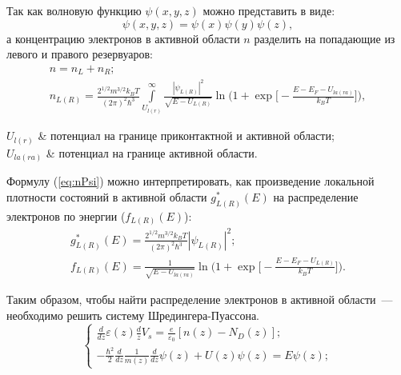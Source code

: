 Так как волновую функцию $\psi(x, y,z )$ можно представить в виде:
\begin{equation}
	\psi(x, y, z) = \psi(x)\psi(y)\psi(z),
\end{equation}
а концентрацию электронов в активной области $n$ разделить на попадающие из левого и правого резервуаров:
\begin{gather}
	n = n_{L} + n_{R};\\
	\label{eq:nPsi}
	n_{L(R)} = \frac{2^{1/2}m^{3/2}k_{B}T}{(2\pi)^{2}\hbar^{3}}\int\limits_{U_{l(r)}}^{\infty} \frac{|\psi_{L(R)}|^{2}}{\sqrt{E - U_{L(R)}}} \ln \bigg( 1 + \exp\bigg[ -\frac{E - E_{F} - U_{la(ra)}}{k_{B}T} \bigg] \bigg),
\end{gather}
\begin{conditions}
	$U_{l(r)}$ & потенциал на границе приконтактной и активной области;\\
	$U_{la(ra)}$ & потенциал на границе активной области.
\end{conditions}
Формулу (\ref{eq:nPsi}) можно интерпретировать, как произведение локальной плотности состояний в активной области $g^{*}_{L(R)}(E)$ на распределение электронов по энергии ($f_{L(R)}(E)$):
\begin{gather}
	g^{*}_{L(R)}(E) = \frac{2^{1/2}m^{3/2}k_{B}T}{(2\pi)^{2}\hbar^{3}}|\psi_{L(R)}|^{2};\\
	f_{L(R)}(E) =  \frac{1}{\sqrt{E - U_{la(ra)}}} \ln \bigg( 1 + \exp\bigg[ -\frac{E - E_{F} - U_{L(R)}}{k_{B}T} \bigg] \bigg).
\end{gather}

Таким образом, чтобы найти распределение электронов в активной области~--- необходимо решить систему Шредингера-Пуассона.
\begin{equation}
	\label{eq:P-S}
	\begin{cases}
		\frac{d}{dz}\varepsilon(z)\frac{d}{z}V_{s} = \frac{e}{\varepsilon_{0}}[n(z) - N_{D}(z)];\\
		-\frac{\hbar^{2}}{2}\frac{d}{dz}\frac{1}{m(z)}\frac{d}{dz}\psi(z) + U(z)\psi(z) = E\psi(z);
	\end{cases}
\end{equation}
